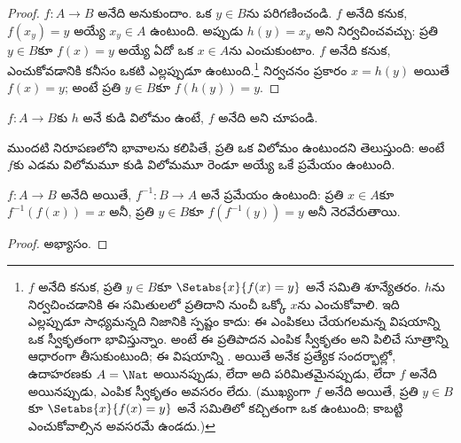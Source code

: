\documentclass[../../../include/open-logic-section]{subfiles}
\begin{document}
\begin{proof}
$f\colon A \to B$ అనేది  అనుకుందాం.
ఒక $y \in B$ను పరిగణించండి. $f$ అనేది  కనుక,
$f(x_y) = y$ అయ్యే $x_y \in A$ ఉంటుంది.
అప్పుడు $h(y) = x_y$ అని నిర్వచించవచ్చు: ప్రతి $y \in B$కూ
$f(x) = y$ అయ్యే ఏదో ఒక $x \in A$ను ఎంచుకుంటాం.
$f$ అనేది  కనుక, ఎంచుకోవడానికి కనీసం ఒకటి ఎల్లప్పుడూ
ఉంటుంది.\footnote{$f$ అనేది  కనుక, ప్రతి $y \in B$కూ
$\Setabs{x}{f(x) = y}$ అనే సమితి శూన్యేతరం.
$h$ను నిర్వచించడానికి ఈ సమితులలో ప్రతిదాని నుంచీ ఒక్కో $x$ను
ఎంచుకోవాలి. ఇది ఎల్లప్పుడూ సాధ్యమన్నది నిజానికి స్పష్టం కాదు:
ఈ ఎంపికలు చేయగలమన్న విషయాన్ని ఒక స్వీకృతంగా భావిస్తున్నాం.
అంటే ఈ ప్రతిపాదన ఎంపిక స్వీకృతం అని పిలిచే సూత్రాన్ని ఆధారంగా తీసుకుంటుంది;
ఈ విషయాన్ని .
అయితే అనేక ప్రత్యేక సందర్భాల్లో, ఉదాహరణకు $A = \Nat$ అయినప్పుడు,
లేదా అది పరిమితమైనప్పుడు, లేదా $f$ అనేది  అయినప్పుడు,
ఎంపిక స్వీకృతం అవసరం లేదు. (ముఖ్యంగా $f$ అనేది  అయితే,
ప్రతి $y \in B$కూ $\Setabs{x}{f(x) = y}$ అనే సమితిలో కచ్చితంగా ఒక
 ఉంటుంది; కాబట్టి ఎంచుకోవాల్సిన అవసరమే ఉండదు.)}
నిర్వచనం ప్రకారం $x = h(y)$ అయితే $f(x) = y$;
అంటే ప్రతి $y \in B$కూ $f(h(y)) = y$.
\end{proof}

\begin{prob}
$f\colon A \to B$కు $h$ అనే కుడి విలోమం ఉంటే,
$f$ అనేది  అని చూపండి.
\end{prob}

\begin{explain}
ముందటి నిరూపణలోని భావాలను కలిపితే, ప్రతి  ఒక విలోమం
ఉంటుందని తెలుస్తుంది: అంటే $f$కు ఎడమ విలోమమూ కుడి విలోమమూ
రెండూ అయ్యే ఒకే ప్రమేయం ఉంటుంది.
\end{explain}

\begin{prop}
$f\colon A \to B$ అనేది  అయితే,
$f^{-1}\colon B \to A$ అనే ప్రమేయం ఉంటుంది:
ప్రతి $x \in A$కూ $f^{-1}(f(x)) = x$ అనీ,
ప్రతి $y \in B$కూ $f(f^{-1}(y)) = y$ అనీ నెరవేరుతాయి.
\end{prop}

\begin{proof}
అభ్యాసం.
\end{proof}
\end{document}
